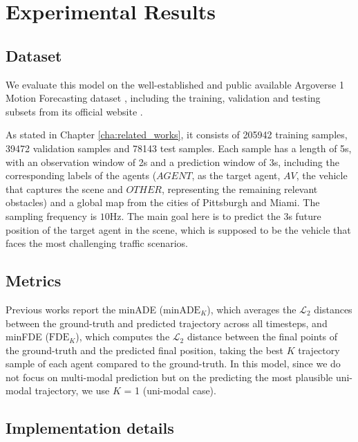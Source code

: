 \section{Experimental Results}
\label{sec:5_experimental_results}

\subsection{Dataset}
\label{subsec:5_dataset}

We evaluate this model on the well-established and public available Argoverse 1 Motion Forecasting dataset \cite{chang2019argoverse}, including the training, validation and testing subsets from its official website \cite{argobench}. 

As stated in Chapter \ref{cha:related_works}, it consists of 205942 training samples, 39472 validation samples and 78143 test samples. Each sample has a length of 5s, with an observation window of 2s and a prediction window of 3s, including the corresponding labels of the agents ($AGENT$, as the target agent, $AV$, the vehicle that captures the scene and $OTHER$, representing the remaining relevant obstacles) and a global map from the cities of Pittsburgh and Miami. The sampling frequency is $10\mathrm{Hz}$. The main goal here is to predict the 3s future position of the target agent in the scene, which is supposed to be the vehicle that faces the most challenging traffic scenarios.

\subsection{Metrics}
\label{subsec:5_metrics}

Previous works \cite{chai2019multipath, mercat2020multi, sadeghian2019sophie} report the \ac{minADE} ($\text{minADE}_K$), which averages the $\mathcal{L}_2$ distances between the ground-truth and predicted trajectory across all timesteps, and \ac{minFDE} ($\text{FDE}_K$), which computes the $\mathcal{L}_2$ distance between the final points of the ground-truth and the predicted final position, taking the best $K$ trajectory sample of each agent compared to the ground-truth. In this model, since we do not focus on multi-modal prediction but on the predicting the most plausible uni-modal trajectory, we use $K$ = 1 (uni-modal case).

\subsection{Implementation details}
\label{subsec:5_implementation_details}

